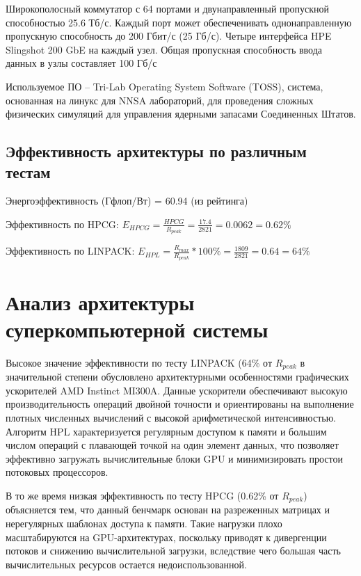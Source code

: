 \documentclass[14pt,a4paper]{extarticle}
\begin{document}
    Широкополосный коммутатор с 64 портами и двунаправленный пропускной
    способностью 25.6 Тб/с. Каждый порт может обеспеченивать однонаправленную
    пропускную способность до 200 Гбит/с (25 Гб/с). Четыре интерфейса HPE Slingshot 200 GbE на каждый узел. Общая пропускная способность ввода данных в узлы составляет 100 Гб/с~\cite{hardware}

    Используемое ПО -- Tri-Lab Operating System Software (TOSS), система,
    основанная на линукс для NNSA лабораторий, для проведения сложных
    физических симуляций для управления ядерными запасами Соединенных Штатов.

    \subsection{Эффективность архитектуры по различным тестам}

    Энергоэффективность (Гфлоп/Вт) = 60.94 (из рейтинга)

    Эффективность по HPCG: $E_{ HPCG } = \frac{HPCG}{R_{peak}} = \frac{17.4}{2821} = 0.0062 = 0.62\%$

    Эффективность по LINPACK: $E_{ HPL } = \frac{R_{max}}{R_{peak}} * 100\% = \frac{1809}{2821} = 0.64 = 64\%$

\newpage
\section{Анализ архитектуры суперкомпьютерной системы}

Высокое значение эффективности по тесту LINPACK (64\% от $R_{peak}$ в
значительной степени обусловлено архитектурными особенностями графических
ускорителей AMD Instinct MI300A. Данные ускорители обеспечивают высокую
производительность операций двойной точности и ориентированы на выполнение
плотных численных вычислений с высокой арифметической интенсивностью. Алгоритм
HPL характеризуется регулярным доступом к памяти и большим числом операций с
плавающей точкой на один элемент данных, что позволяет эффективно загружать
вычислительные блоки GPU и минимизировать простои потоковых процессоров.

В то же время низкая эффективность по тесту HPCG (0.62\% от $R_{ peak }$)
объясняется тем, что данный бенчмарк основан на разреженных матрицах и
нерегулярных шаблонах доступа к памяти. Такие нагрузки плохо масштабируются на
GPU-архитектурах, поскольку приводят к дивергенции потоков и снижению
вычислительной загрузки, вследствие чего большая часть вычислительных ресурсов
остается недоиспользованной.
\end{document}
